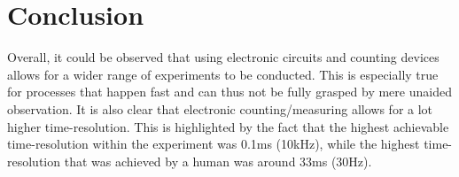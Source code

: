 \documentclass[fleqn,14pt]{article}
\begin{document}
\section{Conclusion}
Overall, it could be observed that using electronic circuits and counting devices allows for a wider range
of experiments to be conducted. This is especially true for processes that happen fast and can thus not
be fully grasped by mere unaided observation. It is also clear that electronic counting/measuring allows
for a lot higher time-resolution. This is highlighted by the fact that the
highest achievable time-resolution within the experiment was 0.1ms (10kHz), while the highest time-resolution
that was achieved by a human was around 33ms (30Hz).

\printbibliography
\end{document}

